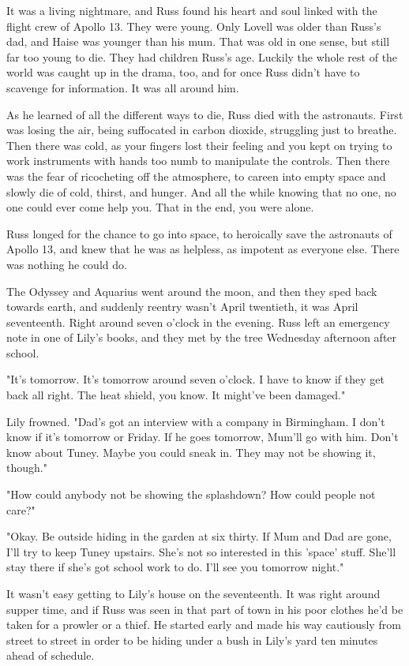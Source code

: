 \documentclass[a4paper,11pt]{article}
\begin{document}
It was a living nightmare, and Russ found his heart and soul linked with the flight crew of Apollo 13. They were young. Only Lovell was older than Russ's dad, and Haise was younger than his mum. That was old in one sense, but still far too young to die. They had children Russ's age. Luckily the whole rest of the world was caught up in the drama, too, and for once Russ didn't have to scavenge for information. It was all around him.

As he learned of all the different ways to die, Russ died with the astronauts. First was losing the air, being suffocated in carbon dioxide, struggling just to breathe. Then there was cold, as your fingers lost their feeling and you kept on trying to work instruments with hands too numb to manipulate the controls. Then there was the fear of ricocheting off the atmosphere, to careen into empty space and slowly die of cold, thirst, and hunger. And all the while knowing that no one, no one could ever come help you. That in the end, you were alone.

Russ longed for the chance to go into space, to heroically save the astronauts of Apollo 13, and knew that he was as helpless, as impotent as everyone else. There was nothing he could do.

The Odyssey and Aquarius went around the moon, and then they sped back towards earth, and suddenly reentry wasn't April twentieth, it was April seventeenth. Right around seven o'clock in the evening. Russ left an emergency note in one of Lily's books, and they met by the tree Wednesday afternoon after school.

"It's tomorrow. It's tomorrow around seven o'clock. I have to know if they get back all right. The heat shield, you know. It might've been damaged."

Lily frowned. "Dad's got an interview with a company in Birmingham. I don't know if it's tomorrow or Friday. If he goes tomorrow, Mum'll go with him. Don't know about Tuney. Maybe you could sneak in. They may not be showing it, though."

"How could anybody not be showing the splashdown? How could people not care?"

"Okay. Be outside hiding in the garden at six thirty. If Mum and Dad are gone, I'll try to keep Tuney upstairs. She's not so interested in this 'space' stuff. She'll stay there if she's got school work to do. I'll see you tomorrow night."

It wasn't easy getting to Lily's house on the seventeenth. It was right around supper time, and if Russ was seen in that part of town in his poor clothes he'd be taken for a prowler or a thief. He started early and made his way cautiously from street to street in order to be hiding under a bush in Lily's yard ten minutes ahead of schedule.
\end{document}
